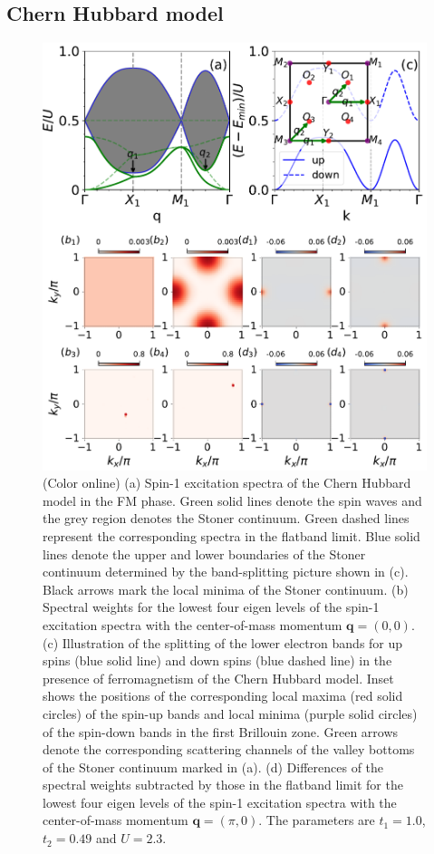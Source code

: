 \documentclass[amsmath,superscriptaddress,showpacs,aps,prb,twocolumn]{revtex4-1}
\begin{document}
\subsection{Chern Hubbard model}\label{CHM}
\begin{figure}
\includegraphics[width=\columnwidth]{fmcispectrum}
\caption{(Color online) (a) Spin-1 excitation spectra of the Chern Hubbard model in the FM phase. Green solid lines denote the spin waves and the grey region denotes the Stoner continuum. Green dashed lines represent the corresponding spectra in the flatband limit. Blue solid lines denote the upper and lower boundaries of the Stoner continuum determined by the band-splitting picture shown in (c). Black arrows mark the local minima of the Stoner continuum. (b) Spectral weights for the lowest four eigen levels of the spin-1 excitation spectra with the center-of-mass momentum $\mathbf{q}=(0,0)$. (c) Illustration of the splitting of the lower electron bands for up spins (blue solid line) and down spins (blue dashed line) in the presence of ferromagnetism of the Chern Hubbard model. Inset shows the positions of the corresponding local maxima (red solid circles) of the spin-up bands and local minima (purple solid circles) of the spin-down bands in the first Brillouin zone. Green arrows denote the corresponding scattering channels of the valley bottoms of the Stoner continuum marked in (a). (d) Differences of the spectral weights subtracted by those in the flatband limit for the lowest four eigen levels of the spin-1 excitation spectra with the center-of-mass momentum $\mathbf{q}=(\pi,0)$. The parameters are $t_1=1.0$, $t_2=0.49$ and $U=2.3$.}
\label{fmcispectrum}
\end{figure}
\end{document}
